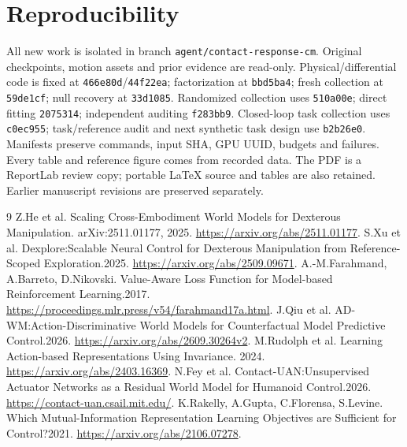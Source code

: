 \documentclass[10pt]{article}
\begin{document}
\section*{Reproducibility}
All new work is isolated in branch \texttt{agent/contact-response-cm}. Original
checkpoints, motion assets and prior evidence are read-only. Physical/differential
code is fixed at \texttt{466e80d}/\texttt{44f22ea}; factorization at
\texttt{bbd5ba4}; fresh collection at \texttt{59de1cf}; null recovery at
\texttt{33d1085}. Randomized collection uses \texttt{510a00e}; direct fitting
\texttt{2075314}; independent auditing \texttt{f283bb9}. Closed-loop task
collection uses \texttt{c0ec955}; task/reference audit and next synthetic task
design use \texttt{b2b26e0}. Manifests preserve commands, input SHA, GPU UUID,
budgets and failures. Every table and reference figure comes from recorded data.
The PDF is a ReportLab review copy; portable LaTeX source and tables are also
retained. Earlier manuscript revisions are preserved separately.

\begin{thebibliography}{9}
 Z.He et al. Scaling Cross-Embodiment World Models for Dexterous Manipulation.
arXiv:2511.01177, 2025. \url{https://arxiv.org/abs/2511.01177}.
 S.Xu et al. Dexplore:Scalable Neural Control for Dexterous Manipulation
from Reference-Scoped Exploration.2025. \url{https://arxiv.org/abs/2509.09671}.
 A.-M.Farahmand, A.Barreto, D.Nikovski. Value-Aware Loss Function
for Model-based Reinforcement Learning.2017. \url{https://proceedings.mlr.press/v54/farahmand17a.html}.
 J.Qiu et al. AD-WM:Action-Discriminative World Models for Counterfactual
Model Predictive Control.2026. \url{https://arxiv.org/abs/2609.30264v2}.
 M.Rudolph et al. Learning Action-based Representations Using Invariance.
2024. \url{https://arxiv.org/abs/2403.16369}.
 N.Fey et al. Contact-UAN:Unsupervised Actuator Networks as a Residual
World Model for Humanoid Control.2026. \url{https://contact-uan.csail.mit.edu/}.
 K.Rakelly, A.Gupta, C.Florensa, S.Levine. Which Mutual-Information
Representation Learning Objectives are Sufficient for Control?2021.
\url{https://arxiv.org/abs/2106.07278}.
\end{thebibliography}
\end{document}
